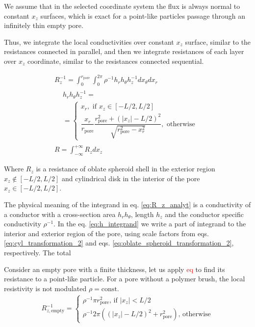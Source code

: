\documentclass[10pt, a4paper]{article}
\newcommand\todo[1]{\textcolor{red}{#1}}
\begin{document}
\begin{multicols}{2}
We assume that in the selected coordinate system the flux is always normal to constant $x_z$ surfaces, which is exact for a point-like particles passage through an infinitely thin empty pore.

Thus, we integrate the local conductivities over constant $x_z$ surface, similar to the resistances connected in parallel, and then we integrate resistances of each layer over $x_z$ coordinate, similar to the resistances connected sequential.

\begin{gather}
    \label{eq:R_z_analyt}
    R_z^{-1} = \int_{0}^{r_{\textrm{pore}}} \int_{0}^{2\pi} \rho^{-1} h_r h_{\theta} h_z^{-1} dx_{\theta} dx_r
    \\
    \label{eq:h_integrand}
    \begin{aligned} 
        &h_r h_{\theta} h_z^{-1} = \\ &=
        \begin{cases}
            x_r, \textrm{ if } x_z \in [-L/2,L/2]
            \\[2pt]
            \dfrac{x_r}{r_{\textrm{pore}}}\dfrac{r_{\textrm{pore}}^2 + (|x_z|-L/2)^2}{\sqrt{r_{\textrm{pore}}^2 - x_r^2}}, \textrm{ otherwise}
        \end{cases}
    \end{aligned}
    \\
    \label{eq:R_analyt}
    R = \int_{-\infty}^{+\infty} R_z dx_z
\end{gather}

Where $R_z$ is a resistance of oblate spheroid shell in the exterior region $x_z \notin [-L/2, L/2]$ and cylindrical disk in the interior of the pore $x_z \in [-L/2, L/2]$. 

The physical meaning of the integrand in eq. \ref{eq:R_z_analyt} is a conductivity of a conductor with a cross-section area $h_r h_{\theta}$, length $h_z$ and the conductor specific conductivity $\rho^{-1}$.
In the eq. \ref{eq:h_integrand} we write a part of integrand to the interior and exterior region of the pore, using scale factors from eqs. \ref{eq:cyl_transformation_2} and eqs. \ref{eq:oblate_spheroid_transformation_2}, respectively.
The total 

Consider an empty pore with a finite thickness, let us apply \todo{eq} to find its resistance to a point-like particle.
For a pore without a polymer brush, the local resistivity is not modulated $\rho = \textrm{const}$.
\begin{gather}
    \label{eq:r_z_empty}
    R_{z, \textrm{empty}}^{-1} = 
    \begin{cases}
        \rho^{-1} \pi r_{\textrm{pore}}^2 \textrm{, if } |x_z| < L/2
        \\
        \rho^{-1} 2 \pi ((|x_z|-L/2)^2 + r_{\textrm{pore}}^2) \textrm{, otherwise} 
    \end{cases}
\end{gather}


\end{multicols}
\end{document}
